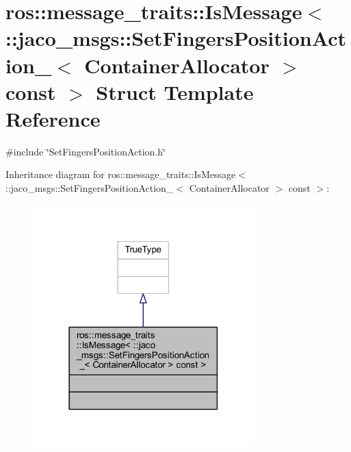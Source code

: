 \hypertarget{structros_1_1message__traits_1_1IsMessage_3_01_1_1jaco__msgs_1_1SetFingersPositionAction___3_01Caf1fc3d4a1a1bf21603541e53ed9a91b}{}\section{ros\+:\+:message\+\_\+traits\+:\+:Is\+Message$<$ \+:\+:jaco\+\_\+msgs\+:\+:Set\+Fingers\+Position\+Action\+\_\+$<$ Container\+Allocator $>$ const $>$ Struct Template Reference}
\label{structros_1_1message__traits_1_1IsMessage_3_01_1_1jaco__msgs_1_1SetFingersPositionAction___3_01Caf1fc3d4a1a1bf21603541e53ed9a91b}


{\ttfamily \#include \char`\"{}Set\+Fingers\+Position\+Action.\+h\char`\"{}}



Inheritance diagram for ros\+:\+:message\+\_\+traits\+:\+:Is\+Message$<$ \+:\+:jaco\+\_\+msgs\+:\+:Set\+Fingers\+Position\+Action\+\_\+$<$ Container\+Allocator $>$ const $>$\+:
\nopagebreak
\begin{figure}[H]
\begin{center}
\leavevmode
\includegraphics[width=242pt]{d0/d07/structros_1_1message__traits_1_1IsMessage_3_01_1_1jaco__msgs_1_1SetFingersPositionAction___3_01C63e4a1d2f8994dee751ce1b194577d2f}
\end{center}
\end{figure}


